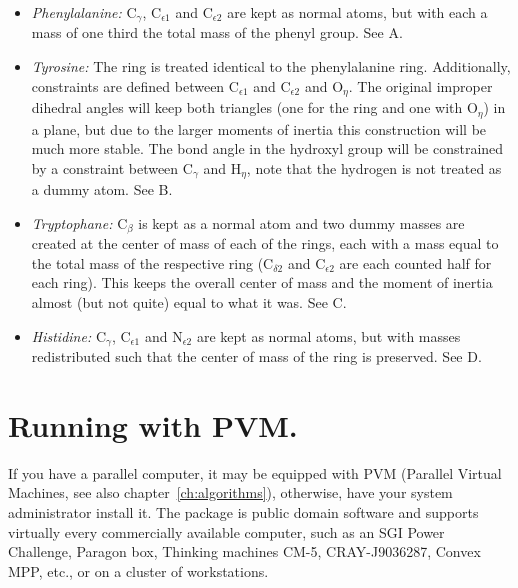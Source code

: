\begin{itemize}

\item{\em Phenylalanine:\/} {\sf C}$_\gamma$, {\sf C}$_{{\epsilon}1}$
and {\sf C}$_{{\epsilon}2}$ are kept as normal atoms, but with each a
mass of one third the total mass of the phenyl group. See
A.

\item{\em Tyrosine:\/} The ring is treated identical to the
phenylalanine ring. Additionally, constraints are defined between {\sf
C}$_{{\epsilon}1}$ and {\sf C}$_{{\epsilon}2}$ and {\sf O}$_{\eta}$.
The original improper dihedral angles will keep both triangles (one
for the ring and one with {\sf O}$_{\eta}$) in a plane, but due to the
larger moments of inertia this construction will be much more
stable. The bond angle in the hydroxyl group will be constrained by a
constraint between {\sf C}$_\gamma$ and {\sf H}$_{\eta}$, note that
the hydrogen is not treated as a dummy atom. See
B.

\item{\em Tryptophane:\/} {\sf C}$_\beta$ is kept as a normal atom
and two dummy masses are created at the center of mass of each of the
rings, each with a mass equal to the total mass of the respective ring
({\sf C}$_{{\delta}2}$ and {\sf C}$_{{\epsilon}2}$ are each
counted half for each ring). This keeps the overall center of mass and
the moment of inertia almost (but not quite) equal to what it was. See
C.

\item{\em Histidine:\/} {\sf C}$_\gamma$, {\sf C}$_{{\epsilon}1}$
and {\sf N}$_{{\epsilon}2}$ are kept as normal atoms, but with masses
redistributed such that the center of mass of the ring is
preserved. See D.

\end{itemize}

\section{Running with PVM.}
If you have a parallel computer, it may be equipped with PVM (Parallel
Virtual Machines, see also chapter~\ref{ch:algorithms}), otherwise,
have your system administrator install it. The package is public
domain software and supports virtually every commercially available
computer, such as an SGI Power Challenge, Paragon {\intel} box,
Thinking machines CM-5, CRAY-J9036287, Convex MPP, etc., or on a
cluster of workstations.


